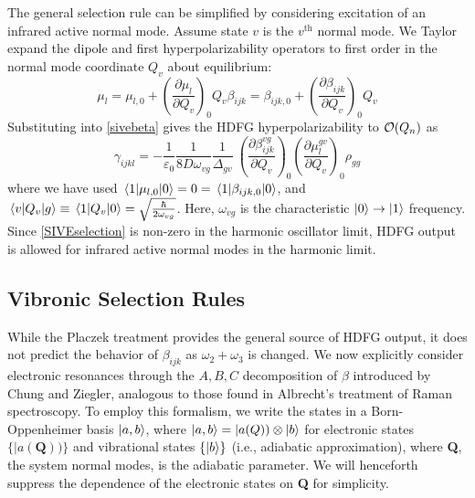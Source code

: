 \documentclass[aip, jcp, reprint, onecolumn, nofootinbib]{revtex4-2}
\begin{document}
The general selection rule can be simplified by considering excitation of an infrared active normal mode.  
Assume state $v$ is the $v^{\text{th}}$ normal mode.
We Taylor expand the dipole and first hyperpolarizability operators to first order in the normal mode coordinate $Q_v$ about equilibrium:\cite{Long1970, Shen90}
\begin{subequations}
	\begin{equation}
		\mu_l = \mu_{l,0} + \left(\frac{\partial \mu_l}{\partial Q_v}\right)_0 Q_v 
	\end{equation}
	\begin{equation}
		\beta_{ijk} = \beta_{ijk,0} + \left(\frac{\partial \beta_{ijk}}{\partial Q_v}\right)_0 Q_v
	\end{equation}
\end{subequations}
Substituting into \autoref{sivebeta} gives the HDFG hyperpolarizability to $\order{Q_n}$ as \begin{equation}\label{SIVEselection}
	\gamma_{ijkl} =	-\frac{1}{\varepsilon_0} \frac{1}{8D \omega_{vg}}  \frac{1}{{\Delta_{gv}}} \ \left(\frac{\partial \beta^{vg}_{ijk}}{\partial Q_v}\right)_0 \left({\frac{\partial \mu^{gv}_{l}}{\partial Q_v}}\right)_0  \rho_{gg}
\end{equation}
where we have used $\mel{1}{\mu_{l,0}}{0} = 0 = \mel{1}{\beta_{ijk,0}}{0}$, and $\mel{v}{Q_v}{g} \equiv \mel{1}{Q_v}{0} = \sqrt{\frac{\hbar}{2\omega_{vg}}}$. Here, $\omega_{vg}$ is the characteristic $\ket{0} \rightarrow \ket{1}$ frequency.\cite{RN459}
Since \autoref{SIVEselection} is non-zero in the harmonic oscillator limit, HDFG output is allowed for infrared active normal modes in the harmonic limit. 

\subsection{Vibronic Selection Rules}\label{Albrecht}
While the Placzek treatment provides the general source of HDFG output, it does not predict the behavior of $\beta_{ijk}$ as $\omega_2 + \omega_3$ is changed.
We now explicitly consider electronic resonances through the $A,B,C$ decomposition of $\beta$ introduced by Chung and Ziegler, analogous to those found in Albrecht's treatment of Raman spectroscopy.\cite{Albrecht1961, Ziegler1988} 
To employ this formalism, we write the states in a Born-Oppenheimer basis $\ket{a,b}$, where $\ket{a,b} = |a(Q)) \otimes \ket{b}$ for electronic states $\{|a(\textbf{Q}))\}$ and vibrational states $\{\ket{b}\}$ (i.e., adiabatic approximation), where \textbf{Q}, the system normal modes, is the adiabatic parameter. \cite{BornOppenheimer, Tang1970}
We will henceforth suppress the dependence of the electronic states on \textbf{Q} for simplicity.
\end{document}

